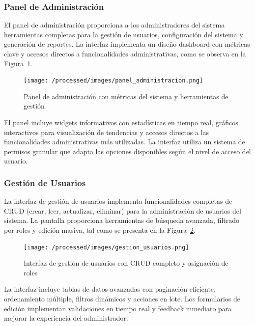 \documentclass[12pt,a4paper,oneside]{report}
\begin{document}
\subsubsection{Panel de Administración}\label{panel-de-administracion}

El panel de administración proporciona a los administradores del sistema herramientas completas para la gestión de usuarios, configuración del sistema y generación de reportes. La interfaz implementa un diseño dashboard con métricas clave y accesos directos a funcionalidades administrativas, como se observa en la Figura~\ref{fig:panel-administracion}.

\begin{figure}[H]
\centering
\texttt{[image: /processed/images/panel\_administracion.png]}
\caption{Panel de administración con métricas del sistema y herramientas de gestión}
\label{fig:panel-administracion}
\end{figure}

El panel incluye widgets informativos con estadísticas en tiempo real, gráficos interactivos para visualización de tendencias y accesos directos a las funcionalidades administrativas más utilizadas. La interfaz utiliza un sistema de permisos granular que adapta las opciones disponibles según el nivel de acceso del usuario.

\subsubsection{Gestión de Usuarios}\label{gestion-de-usuarios}

La interfaz de gestión de usuarios implementa funcionalidades completas de CRUD (crear, leer, actualizar, eliminar) para la administración de usuarios del sistema. La pantalla proporciona herramientas de búsqueda avanzada, filtrado por roles y edición masiva, tal como se presenta en la Figura~\ref{fig:gestion-usuarios}.

\begin{figure}[H]
\centering
\texttt{[image: /processed/images/gestion\_usuarios.png]}
\caption{Interfaz de gestión de usuarios con CRUD completo y asignación de roles}
\label{fig:gestion-usuarios}
\end{figure}

La interfaz incluye tablas de datos avanzadas con paginación eficiente, ordenamiento múltiple, filtros dinámicos y acciones en lote. Los formularios de edición implementan validaciones en tiempo real y feedback inmediato para mejorar la experiencia del administrador.
\end{document}
